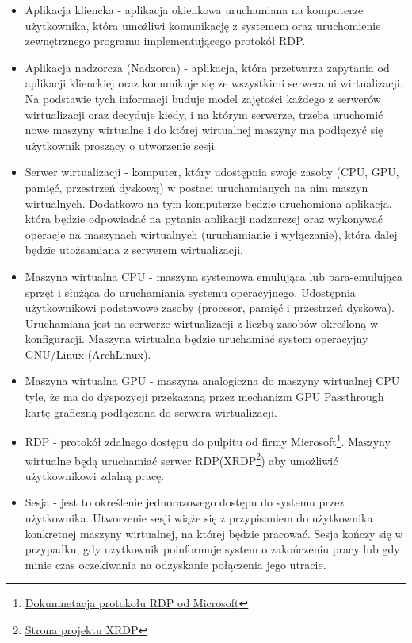 \documentclass[12pt]{article}
\begin{document}
\begin{itemize}
	\item Aplikacja kliencka - aplikacja okienkowa uruchamiana na komputerze użytkownika, która umożliwi komunikację z systemem oraz uruchomienie zewnętrznego programu implementującego protokół RDP.
	\item Aplikacja nadzorcza (Nadzorca) - aplikacja, która przetwarza zapytania od aplikacji klienckiej oraz komunikuje się ze wszystkimi serwerami wirtualizacji. Na podstawie tych informacji buduje model zajętości każdego z serwerów wirtualizacji oraz decyduje kiedy, i na którym serwerze, trzeba uruchomić nowe maszyny wirtualne i do której wirtualnej maszyny ma podłączyć się użytkownik proszący o utworzenie sesji.
	\item Serwer wirtualizacji - komputer, który udostępnia swoje zasoby (CPU, GPU, pamięć, przestrzeń dyskową) w postaci uruchamianych na nim maszyn wirtualnych. Dodatkowo na tym komputerze będzie uruchomiona aplikacja, która będzie odpowiadać na pytania aplikacji nadzorczej oraz wykonywać operacje na maszynach wirtualnych (uruchamianie i wyłączanie), która dalej będzie utożsamiana z serwerem wirtualizacji.
	\item Maszyna wirtualna CPU - maszyna systemowa emulująca lub para-emulująca sprzęt i służąca do uruchamiania systemu operacyjnego. Udostępnia użytkownikowi podstawowe zasoby (procesor, pamięć i przestrzeń dyskowa). Uruchamiana jest na serwerze wirtualizacji z liczbą zasobów określoną w konfiguracji. Maszyna wirtualna będzie uruchamiać system operacyjny GNU/Linux (ArchLinux).
	\item Maszyna wirtualna GPU - maszyna analogiczna do maszyny wirtualnej CPU tyle, że ma do dyspozycji przekazaną przez mechanizm GPU Passthrough kartę graficzną podłączona do serwera wirtualizacji.
	\item RDP - protokół zdalnego dostępu do pulpitu od firmy Microsoft\footnote{\href{https://docs.microsoft.com/en-us/troubleshoot/windows-server/remote/understanding-remote-desktop-protocol}{Dokumnetacja protokołu RDP od Microsoft}}. Maszyny wirtualne będą uruchamiać serwer RDP(XRDP\footnote{\href{http://xrdp.org/}{Strona projektu XRDP}}) aby umożliwić użytkownikowi zdalną pracę.
	\item Sesja - jest to określenie jednorazowego dostępu do systemu przez użytkownika. Utworzenie sesji wiąże się z przypisaniem do użytkownika konkretnej maszyny wirtualnej, na której będzie pracować. Sesja kończy się w przypadku, gdy użytkownik poinformuje system o zakończeniu pracy lub gdy minie czas oczekiwania na odzyskanie połączenia jego utracie.

\end{itemize}
\end{document}
